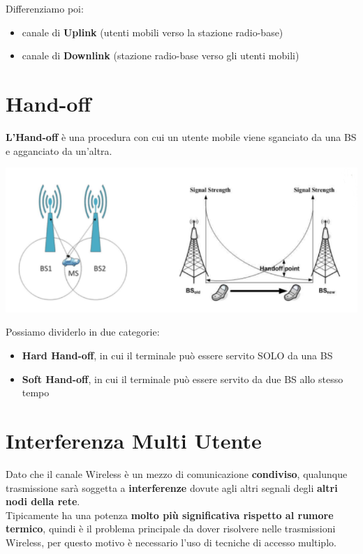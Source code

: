 Differenziamo poi:
\begin{itemize}
    \item canale di \textbf{Uplink} (utenti mobili verso la stazione radio-base)
    \item canale di \textbf{Downlink} (stazione radio-base verso gli utenti mobili)
\end{itemize}

\section{Hand-off}
\textbf{L'Hand-off} è una procedura con cui un utente mobile viene sganciato da una BS e agganciato da un'altra.
\begin{center}
    \includegraphics[width=\textwidth]{Images/HandOff.png}
\end{center}


Possiamo dividerlo in due categorie:
\begin{itemize}
    \item \textbf{Hard Hand-off}, in cui il terminale può essere servito SOLO da una BS
    \item \textbf{Soft Hand-off}, in cui il terminale può essere servito da due BS allo stesso tempo
\end{itemize}

\section{Interferenza Multi Utente}
Dato che il canale Wireless è un mezzo di comunicazione \textbf{condiviso}, qualunque trasmissione sarà soggetta a \textbf{interferenze} dovute agli altri segnali degli \textbf{altri nodi della rete}. \\
Tipicamente ha una potenza \textbf{molto più significativa rispetto al rumore termico}, quindi è il problema principale da dover risolvere nelle trasmissioni Wireless, per questo motivo è necessario l'uso di tecniche di accesso multiplo.

